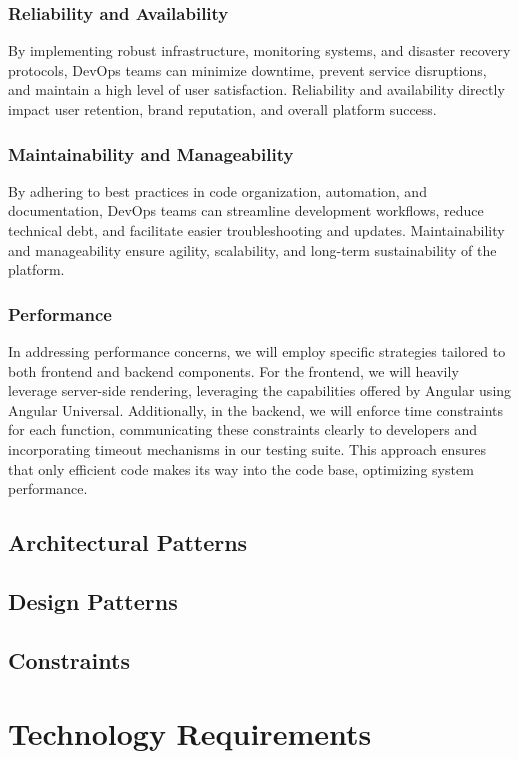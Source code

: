 \documentclass[a4paper,12pt]{article}
\begin{document}
\subsubsection{Reliability and Availability}
By implementing robust infrastructure, monitoring systems, and disaster recovery protocols, DevOps teams 
can minimize downtime, prevent service disruptions, and maintain a high level of user satisfaction. Reliability 
and availability directly impact user retention, brand reputation, and overall platform success.

\subsubsection{Maintainability and Manageability}
By adhering to best practices in code organization, automation, and documentation, DevOps teams can streamline 
development workflows, reduce technical debt, and facilitate easier troubleshooting and updates. Maintainability 
and manageability ensure agility, scalability, and long-term sustainability of the platform.

\subsubsection{Performance}
In addressing performance concerns, we will employ specific strategies tailored to both frontend and backend 
components. For the frontend, we will heavily leverage server-side rendering, leveraging the capabilities 
offered by Angular using Angular Universal. Additionally, in the backend, we will enforce time constraints 
for each function, communicating these constraints clearly to developers and incorporating timeout mechanisms 
in our testing suite. This approach ensures that only efficient code makes its way into the code base, optimizing 
system performance.


\subsection{Architectural Patterns}
\label{subsec:architectural-patterns}

\subsection{Design Patterns}
\label{subsec:design-patterns}

\subsection{Constraints}
\label{subsec:constraints}

\section{Technology Requirements}
\label{sec:technology-requirements}
\end{document}
